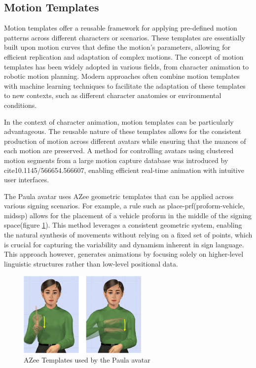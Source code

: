 \documentclass[../../main.tex]{subfiles}
\begin{document}
\subsection{Motion Templates}
\label{ch:intermediate_blocks:related_work:motion_templates}

Motion templates offer a reusable framework for applying pre-defined motion patterns across different characters or scenarios. These templates are essentially built upon motion curves that define the motion's parameters, allowing for efficient replication and adaptation of complex motions. The concept of motion templates has been widely adopted in various fields, from character animation to robotic motion planning. Modern approaches often combine motion templates with machine learning techniques to facilitate the adaptation of these templates to new contexts, such as different character anatomies or environmental conditions.

In the context of character animation, motion templates can be particularly advantageous. The reusable nature of these templates allows for the consistent production of motion across different avatars while ensuring that the nuances of each motion are preserved. A method for controlling avatars using clustered motion segments from a large motion capture database was introduced by cite{10.1145/566654.566607}, enabling efficient real-time animation with intuitive user interfaces.

The Paula avatar uses AZee geometric templates that can be applied across various signing scenarios. For example, a rule such as place-prf(proform-vehicle, midssp) allows for the placement of a vehicle proform in the middle of the signing space(figure \ref{fig:azee_template_example}). This method leverages a consistent geometric system, enabling the natural synthesis of movements without relying on a fixed set of points, which is crucial for capturing the variability and dynamism inherent in sign language. This approach however, generates animations by focusing solely on higher-level linguistic structures rather than low-level positional data.

\begin{figure}
    \centering \includegraphics[width = 2.5in]{chapters/intermediate_blocks/images/azee_template_example.png}
    \caption{AZee Templates used by the Paula avatar}
    \label{fig:azee_template_example}
\end{figure}
\end{document}
